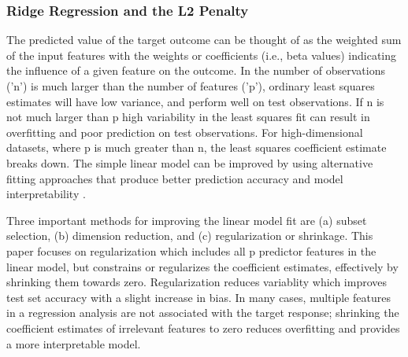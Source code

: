 \documentclass[sigconf]{acmart}
\begin{document}


\subsubsection{Ridge Regression and the L2 Penalty} 

The predicted value of the target outcome can be thought of as the weighted 
sum of the input features with the weights or coefficients (i.e., beta values) 
indicating the influence of a given feature on the outcome. In the number of
observations ('n') is much larger than the number of features ('p'), ordinary 
least squares estimates will have low variance, and perform well on test
observations. If n is not much larger than p high variability in the least
squares fit can result in overfitting and poor prediction on test observations.
For high-dimensional datasets, where p is much greater than n, the least
squares coefficient estimate breaks down. The simple linear model can be
improved by using alternative fitting approaches that produce better 
prediction accuracy and model interpretability \cite{statlearn13}. 

Three
important methods for improving the linear model fit are (a) subset selection,
(b) dimension reduction, and (c) regularization or shrinkage. This paper 
focuses on regularization which includes all p predictor features in the
linear model, but constrains or regularizes the coefficient estimates, 
effectively by shrinking them towards zero. Regularization reduces variablity 
which improves test set accuracy with a slight increase in bias. In many cases, 
multiple features in a regression analysis are not associated with the target
response; shrinking the coefficient estimates of irrelevant features to zero 
reduces overfitting and provides a more interpretable model. 
\end{document}
